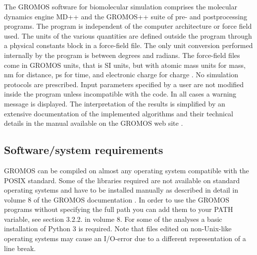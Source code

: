 The GROMOS software for biomolecular simulation comprises the molecular dynamics engine MD++ and the \linebreak GROMOS++ suite of pre- and postprocessing programs. The program is independent of the computer architecture or force field used. 
The units of the various quantities are defined outside the program through a physical constants block in a force-field file. The only unit conversion performed internally by the program is between degrees and radians. The force-field files come 
in GROMOS units, that is SI units, but with atomic mass units for mass, nm for distance, ps for time, and electronic charge for charge \cite{volume_6}. No simulation protocols are prescribed. Input parameters specified by a user are not modified inside 
the program unless incompatible with the code. In all cases a warning message is displayed. The interpretation of the results is simplified by an extensive documentation of the implemented algorithms and their technical details in the manual available on the GROMOS web site \cite{volume_6,volume_2}.


\subsection{Software/system requirements}
%
GROMOS can be compiled on almost any operating system compatible with the POSIX standard.
 Some of the libraries required are not available on standard operating systems and have to be installed 
manually as described in detail in volume 8 of the GROMOS documentation \cite{volume_8}. 
In order to use the GROMOS programs without specifying the full path you can add them to your PATH variable, see section 3.2.2. in volume 8.
For some of the analyses a basic installation of Python 3 is required. 
Note that files edited on non-Unix-like operating systems may cause an I/O-error due to a different representation of a line break.

